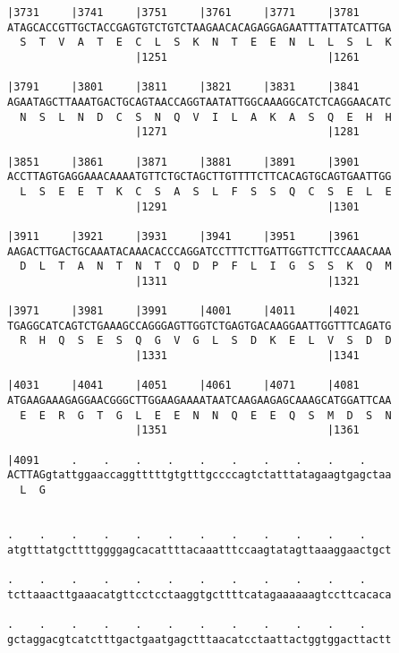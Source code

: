 \documentclass{article}
\begin{document}
\begin{Verbatim}
|3731     |3741     |3751     |3761     |3771     |3781     
ATAGCACCGTTGCTACCGAGTGTCTGTCTAAGAACACAGAGGAGAATTTATTATCATTGA
  S  T  V  A  T  E  C  L  S  K  N  T  E  E  N  L  L  S  L  K
                    |1251                         |1261     
  
|3791     |3801     |3811     |3821     |3831     |3841     
AGAATAGCTTAAATGACTGCAGTAACCAGGTAATATTGGCAAAGGCATCTCAGGAACATC
  N  S  L  N  D  C  S  N  Q  V  I  L  A  K  A  S  Q  E  H  H
                    |1271                         |1281     
  
|3851     |3861     |3871     |3881     |3891     |3901     
ACCTTAGTGAGGAAACAAAATGTTCTGCTAGCTTGTTTTCTTCACAGTGCAGTGAATTGG
  L  S  E  E  T  K  C  S  A  S  L  F  S  S  Q  C  S  E  L  E
                    |1291                         |1301     
  
|3911     |3921     |3931     |3941     |3951     |3961     
AAGACTTGACTGCAAATACAAACACCCAGGATCCTTTCTTGATTGGTTCTTCCAAACAAA
  D  L  T  A  N  T  N  T  Q  D  P  F  L  I  G  S  S  K  Q  M
                    |1311                         |1321     
  
|3971     |3981     |3991     |4001     |4011     |4021     
TGAGGCATCAGTCTGAAAGCCAGGGAGTTGGTCTGAGTGACAAGGAATTGGTTTCAGATG
  R  H  Q  S  E  S  Q  G  V  G  L  S  D  K  E  L  V  S  D  D
                    |1331                         |1341     
  
|4031     |4041     |4051     |4061     |4071     |4081     
ATGAAGAAAGAGGAACGGGCTTGGAAGAAAATAATCAAGAAGAGCAAAGCATGGATTCAA
  E  E  R  G  T  G  L  E  E  N  N  Q  E  E  Q  S  M  D  S  N
                    |1351                         |1361     
  
|4091     .    .    .    .    .    .    .    .    .    .    
ACTTAGgtattggaaccaggtttttgtgtttgccccagtctatttatagaagtgagctaa
  L  G                                                      
                                                            
  
.    .    .    .    .    .    .    .    .    .    .    .    
atgtttatgcttttggggagcacattttacaaatttccaagtatagttaaaggaactgct
                                                            
.    .    .    .    .    .    .    .    .    .    .    .    
tcttaaacttgaaacatgttcctcctaaggtgcttttcatagaaaaaagtccttcacaca
                                                            
.    .    .    .    .    .    .    .    .    .    .    .    
gctaggacgtcatctttgactgaatgagctttaacatcctaattactggtggacttactt
                                                            

\end{Verbatim}
\end{document}
